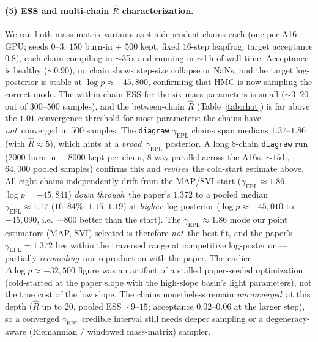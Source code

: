 \documentclass[11pt,letterpaper]{article}
\newcommand{\gammaEPL}{\ensuremath{\gamma_{\mathrm{EPL}}}}
\begin{document}
\paragraph{(5) ESS and multi-chain $\hat R$ characterization.} We ran
both mass-matrix variants as $4$ independent chains each (one per A16
GPU; seeds $0$--$3$; $150$ burn-in $+$ $500$ kept, fixed $16$-step
leapfrog, target acceptance $0.8$), each chain compiling in $\sim$35\,s
and running in $\sim$1\,h of wall time. Acceptance is healthy
($\sim$$0.90$), no chain shows step-size collapse or NaNs, and the
target log-posterior is stable at $\log p\approx-45{,}800$, confirming
that HMC is now sampling the correct mode. The within-chain ESS for the
six mass parameters is small ($\sim$$3$--$20$ out of $300$--$500$
samples), and the between-chain $\hat R$ (Table~\ref{tab:rhat}) is far
above the $1.01$ convergence threshold for most parameters: the chains
have {\it not}\ converged in $500$ samples. The \texttt{diagraw}
$\gammaEPL$ chains span medians $1.37$--$1.86$ (with $\hat R\approx 5$),
which hints at a {\it broad}\ $\gammaEPL$ posterior. A long $8$-chain
\texttt{diagraw} run ($2000$ burn-in $+$ $8000$ kept per chain, $8$-way
parallel across the A16s, $\sim$$15$\,h, $64{,}000$ pooled samples)
confirms this and {\it revises}\ the cold-start estimate above. All eight
chains independently drift from the MAP/SVI start
($\gammaEPL\approx1.86$, $\log p=-45{,}841$) {\it down through}\ the
paper's $1.372$ to a pooled median $\gammaEPL\approx1.17$
($16$--$84\%$: $1.15$--$1.19$) at {\it higher}\ log-posterior
($\log p\approx-45{,}010$ to $-45{,}090$, i.e.\ $\sim$$800$ better than
the start). The $\gammaEPL\approx1.86$ mode our point estimators (MAP,
SVI) selected is therefore {\it not}\ the best fit, and the paper's
$\gammaEPL=1.372$ lies within the traversed range at competitive
log-posterior --- partially {\it reconciling}\ our reproduction with the
paper. The earlier $\Delta\log p\approx-32{,}500$ figure was an artifact
of a stalled paper-seeded optimization (cold-started at the paper slope
with the high-slope basin's light parameters), not the true cost of the
low slope. The chains nonetheless remain {\it unconverged}\ at this depth
($\hat R$ up to $20$, pooled ESS $\sim$$9$--$15$; acceptance $0.02$--$0.06$
at the larger step), so a converged $\gammaEPL$ credible interval still
needs deeper sampling or a degeneracy-aware (Riemannian / windowed
mass-matrix) sampler.
\end{document}
